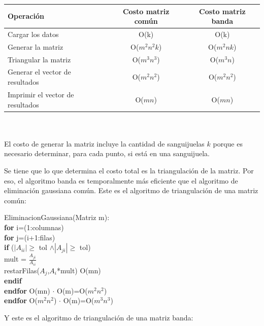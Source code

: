 \documentclass[a4paper]{article}
\begin{document}
\begin{tabular}{ l|c c }
  Operación & Costo matriz común & Costo matriz banda \\
 \hline
  Cargar los datos & O(k) & O(k)  \\
  Generar la matriz & O($m^2n^2k$) & O($m^2nk$) \\
  Triangular la matriz & O($m^3n^3$) & O($m^3n$) \\
  Generar el vector de resultados & O($m^2n^2$) & O($m^2n^2$)\\
  Imprimir el vector de resultados & O($mn$) & O($mn$)
\end{tabular} \\ \\

El costo de generar la matriz incluye la cantidad de sanguijuelas $k$ porque es necesario determinar, para cada punto, si está en una sanguijuela. 

Se tiene que lo que determina el costo total es la triangulación de la matriz. Por eso, el algoritmo banda es temporalmente más eficiente que el algoritmo de eliminación gaussiana común. Este es el algoritmo de triangulación de una matriz común:

\newcommand{\tab}{\hspace*{7mm}}
\begin{codesnippet}

EliminacionGaussiana(Matriz m):\\
\textbf{for} i=(1:columnas)\\
\tab \textbf{for} j=(i+1:filas)\\
\tab \tab \textbf{if} ($|A_{ii}| \geq$ tol $\wedge |A_{ji}| \geq$ tol)\\
\tab \tab \tab mult = $\frac{A_{ji}}{A_{ii}}$\\
\tab \tab \tab restarFilas($A_{j}$,$A_{i}$*mult) \hfill O(mn)\\
\tab \tab \textbf{endif}\\
\tab \textbf{endfor} \hfill O(mn) $\cdot$ O(m)=O($m^2n^2$) \\
\textbf{endfor} \hfill O($m^2n^2$) $\cdot$ O(m)=O($m^3n^3$) \\

\end{codesnippet}

Y este es el algoritmo de triangulación de una matriz banda:
\end{document}
